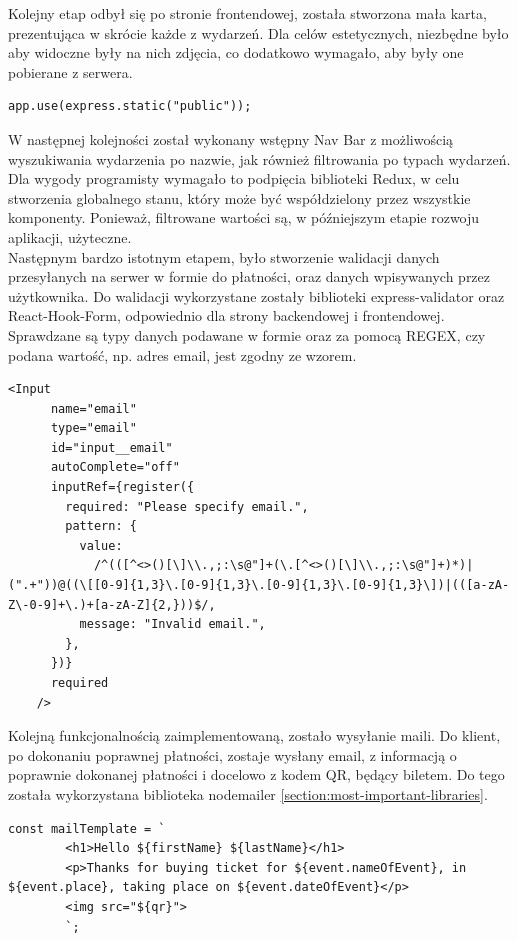 \documentclass[12pt]{article}
\begin{document}
\begin{sloppypar}
{  Kolejny etap odbył się po stronie frontendowej, została stworzona mała karta, prezentująca w skrócie każde z wydarzeń. Dla celów estetycznych, niezbędne było 
  aby widoczne były na nich zdjęcia, co dodatkowo wymagało, aby były one pobierane z serwera.
  \begin{lstlisting}[caption={Linijka kodu odpowiadająca za podpięcie folderu public, w którym znajdują się zdjęcia wydarzeń.}, captionpos=b]
    app.use(express.static("public"));
  \end{lstlisting}
  W następnej kolejności został wykonany wstępny Nav Bar z możliwością wyszukiwania wydarzenia po nazwie, jak również filtrowania po typach wydarzeń. Dla wygody 
  programisty wymagało to podpięcia biblioteki Redux, w celu stworzenia globalnego stanu, który może być współdzielony przez wszystkie komponenty. 
  Ponieważ, filtrowane wartości są, w późniejszym etapie rozwoju aplikacji, użyteczne.\\
  Następnym bardzo istotnym etapem, było stworzenie walidacji danych przesyłanych na serwer w formie do płatności, oraz danych wpisywanych przez użytkownika.
  Do walidacji wykorzystane zostały biblioteki express-validator oraz React-Hook-Form, odpowiednio dla strony backendowej i frontendowej. 
  Sprawdzane są typy danych podawane w formie oraz za pomocą REGEX, czy podana wartość, np. adres email, jest zgodny ze wzorem.
  \begin{lstlisting}[caption={Przykładowy pattern walidacji emaila, po stronie klienta.}, captionpos=b]
    <Input
      name="email"
      type="email"
      id="input__email"
      autoComplete="off"
      inputRef={register({
        required: "Please specify email.",
        pattern: {
          value:
            /^(([^<>()[\]\\.,;:\s@"]+(\.[^<>()[\]\\.,;:\s@"]+)*)|(".+"))@((\[[0-9]{1,3}\.[0-9]{1,3}\.[0-9]{1,3}\.[0-9]{1,3}\])|(([a-zA-Z\-0-9]+\.)+[a-zA-Z]{2,}))$/,
          message: "Invalid email.",
        },
      })}
      required
    />
  \end{lstlisting}
  Kolejną funkcjonalnością zaimplementowaną, zostało wysyłanie maili. 
  Do klient, po dokonaniu poprawnej płatności, zostaje wysłany email, z informacją o poprawnie dokonanej płatności i docelowo z kodem QR, będący biletem.
  Do tego została wykorzystana biblioteka nodemailer \ref{section:most-important-libraries}.
  \begin{lstlisting}[caption=Kod odpowiadający za wysyłanie emaili., captionpos=b]
    const mailTemplate = `
        <h1>Hello ${firstName} ${lastName}</h1>
        <p>Thanks for buying ticket for ${event.nameOfEvent}, in ${event.place}, taking place on ${event.dateOfEvent}</p>
        <img src="${qr}">
        `;


\end{lstlisting}}
\end{sloppypar}
\end{document}
